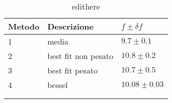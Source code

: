 \begin{longtable}[]{@{}lll@{}}
    \toprule
    Metodo & Descrizione & $f \pm \delta f$ \tabularnewline
    \midrule
    \endhead
1 & media & $9.7 \pm 0.1$ \tabularnewline
2 & best fit non pesato & $10.8 \pm 0.2$ \tabularnewline
3 & best fit pesato & $10.7 \pm 0.5$ \tabularnewline
4 & bessel & $10.08 \pm 0.03$ \tabularnewline
    \bottomrule
    \label{tab:edithere}
    \\
    \caption{edithere}
 \end{longtable}
